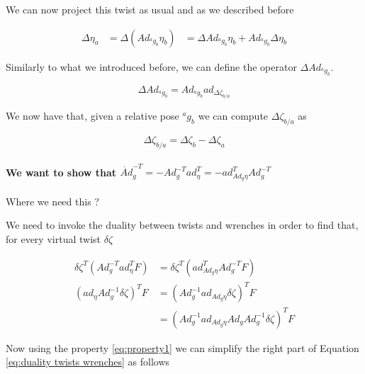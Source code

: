 \documentclass[12pt,a4paper]{book}
\newcommand{\agb}{\ensuremath{{^a g _b}}}
\newcommand{\etaa}{\ensuremath{{\eta_{a}}}}
\newcommand{\etab}{\ensuremath{{\eta_{b}}}}
\newcommand{\Adagb}{\ensuremath{Ad_{\agb}}}
\newcommand{\Dzetaba}{\ensuremath{{\Delta \zeta_{b/a}}}}
\newcommand{\adDzetaba}{\ensuremath{ad_{\Dzetaba}}}
\begin{document}
We can now project this twist as usual and as we described before

\begin{equation}
\begin{aligned}
	\Delta \etaa 	&= \Delta  \left( \Adagb \etab \right)
					&= \Delta \Adagb \etab  + \Adagb \Delta \etab 
\end{aligned}
\end{equation}

Similarly to what we introduced before, we can define the operator $\Delta \Adagb$.

\begin{equation}\label{eq: definition of Delta Ad g}
	\Delta \Adagb = \Adagb \adDzetaba
\end{equation}



We now have that, given a relative pose \agb{} we can compute \Dzetaba{} as 

\begin{equation}
	\Dzetaba = \Delta \zeta _b - \Delta \zeta _a 
\end{equation}


\paragraph{We want to show that $\dot{Ad}_g^{-T} = - Ad_g^{-T} ad_\eta ^T = - ad^T _{Ad_g \eta} Ad_g ^{-T}$}

\color{red} Where we need this ? \color{black}



We need to invoke the duality between twists and wrenches in order to find that, for every virtual twist $\delta \zeta$

\begin{equation}\label{eq:duality twists wrenches}
\begin{aligned}
	\delta \zeta ^T \left( Ad_g^{-T} ad_\eta^T F  \right) &= \delta \zeta ^T \left( ad_{Ad_g \eta}^TAd_g^{-T} F  \right) \\
	\left(  ad_\eta Ad_g^{-1} \delta \zeta  \right)^T F &= \left( Ad_g^{-1} ad_{Ad_g \eta}  \delta \zeta  \right)^T F \\
	&= \left( Ad_g^{-1} ad_{Ad_g \eta}  Ad_g Ad_g ^{-1}\delta \zeta  \right)^T F
\end{aligned}
\end{equation}

Now using the property \eqref{eq:property1} we can simplify the right part of Equation \eqref{eq:duality twists wrenches} as follows
\end{document}

